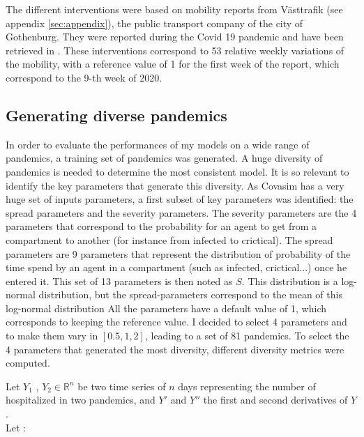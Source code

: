 The different interventions were based on mobility reports from Västtrafik (see appendix \ref{sec:appendix}), the public transport company of the city of Gothenburg. 
They were reported during the Covid 19 pandemic and have been retrieved in \cite{gerlee2021predicting}.
These interventions correspond to 53 relative weekly variations of the mobility, with a reference value of 1 for the first week of the report, which correspond to the 9-th week of 2020. 


\subsection{Generating diverse pandemics}
\label{sec:generating_divserse_pandemics}
In order to evaluate the performances of my models on a wide range of pandemics, a training set of pandemics was generated. 
A huge diversity of pandemics is needed to determine the most consistent model.
It is so relevant to identify the key parameters that generate this diversity.
As Covasim has a very huge set of inputs parameters, a first subset of key parameters was identified: the spread parameters and the severity parameters. 
The severity parameters are the 4 parameters that correspond to the probability for an agent to get from a compartment to another (for instance from infected to crictical). 
The spread parameters are 9 parameters that represent the distribution of probability of the time spend by an agent in a compartment (such as infected, crictical...) once he entered it. 
This set of 13 parameters is then noted as $S$. 
This distribution is a log-normal distribution, but the spread-parameters correspond to the mean of this log-normal distribution
All the parameters have a default value of 1, which corresponds to keeping the reference value. 
I decided to select 4 parameters and to make them vary in $[0.5, 1, 2]$, leading to a set of 81 pandemics. 
To select the 4 parameters that generated the most diversity, different diversity metrics were computed. 

Let $Y_1$ ,  $Y_2 \in \mathbb{R}^n$  be two time series of $n$ days representing the number of hospitalized in two pandemics, and $Y'$ and $Y''$ the first and second derivatives of $Y$.  \\[0.2cm]

Let :  \\


